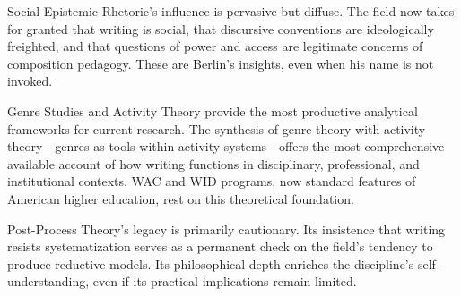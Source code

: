 \documentclass[12pt]{article}
\begin{document}
Social-Epistemic Rhetoric's influence is pervasive but diffuse. The field now takes for granted that writing is social, that discursive conventions are ideologically freighted, and that questions of power and access are legitimate concerns of composition pedagogy. These are Berlin's insights, even when his name is not invoked.

Genre Studies and Activity Theory provide the most productive analytical frameworks for current research. The synthesis of genre theory with activity theory---genres as tools within activity systems---offers the most comprehensive available account of how writing functions in disciplinary, professional, and institutional contexts. WAC and WID programs, now standard features of American higher education, rest on this theoretical foundation.

Post-Process Theory's legacy is primarily cautionary. Its insistence that writing resists systematization serves as a permanent check on the field's tendency to produce reductive models. Its philosophical depth enriches the discipline's self-understanding, even if its practical implications remain limited.
\end{document}
